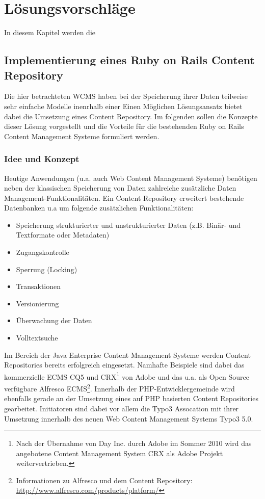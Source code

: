 \chapter{Lösungsvorschläge}
In diesem Kapitel werden die
\section{Implementierung eines Ruby on Rails Content Repository}

Die hier betrachteten WCMS haben bei der Speicherung ihrer Daten teilweise sehr einfache Modelle inenrhalb einer
Einen Möglichen Lösungsansatz bietet dabei die Umsetzung eines Content Repository. Im folgenden sollen die Konzepte dieser Lösung vorgestellt und die Vorteile für die bestehenden Ruby on Rails Content Management Systeme formuliert werden.


\subsection{Idee und Konzept}

Heutige Anwendungen (u.a. auch Web Content Management Systeme) benötigen neben der klassischen Speicherung von Daten zahlreiche zusätzliche Daten Management-Funktionalitäten. Ein Content Repository erweitert bestehende Datenbanken u.a um folgende zusätzlichen Funktionalitäten:

\begin{itemize}
\item
Speicherung strukturierter und unstrukturierter Daten (z.B. Binär- und Textformate oder Metadaten)
\item
Zugangskontrolle
\item
Sperrung (Locking)
\item
Transaktionen
\item
Versionierung
\item
Überwachung der Daten
\item
Volltextsuche
\end{itemize}

Im Bereich der Java Enterprise Content Management Systeme werden Content Repositories bereits erfolgreich eingesetzt. Namhafte Beispiele sind dabei das kommerzielle ECMS CQ5 und CRX\footnote{Nach der Übernahme von Day Inc. durch Adobe im Sommer 2010 wird das angebotene Content Management System CRX als Adobe Projekt weitervertrieben.} von Adobe und das u.a. als Open Source verfügbare Alfresco ECMS\footnote{Informationen zu Alfresco und dem Content Repository: \href{http://www.alfresco.com/products/platform/}{http://www.alfresco.com/products/platform/}}.
Innerhalb der PHP-Entwicklergemeinde wird ebenfalls gerade an der Umsetzung eines auf PHP basierten Content Repositories gearbeitet. Initiatoren sind dabei vor allem die Typo3 Assocation mit ihrer Umsetzung innerhalb des neuen Web Content Management Systems Typo3 5.0.


